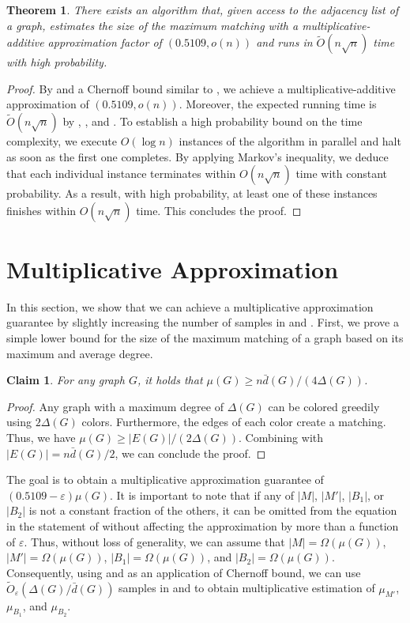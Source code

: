 \documentclass[letterpaper,11pt]{article}
\renewcommand{\epsilon}{\varepsilon}
\newcommand{\wt}[1]{\ensuremath{\widetilde{#1}}}
\newtheorem{theorem}[lemma]{Theorem}
\newtheorem{claim}[lemma]{Claim}
\begin{document}
\begin{theorem}
    There exists an algorithm that, given access to the adjacency list of a graph, estimates the size of the maximum matching with a multiplicative-additive approximation factor of $(0.5109, o(n))$ and runs in $\widetilde{O}(n\sqrt{n})$ time with high probability.
\end{theorem}
\begin{proof}
    By  and a Chernoff bound similar to , we achieve a multiplicative-additive approximation of $(0.5109, o(n))$. Moreover, the expected running time is $\wt{O}(n\sqrt{n})$ by , , and . To establish a high probability bound on the time complexity, we execute $O(\log n)$ instances of the algorithm in parallel and halt as soon as the first one completes. By applying Markov’s inequality, we deduce that each individual instance terminates within $O(n\sqrt{n})$ time with constant probability. As a result, with high probability, at least one of these instances finishes within $O(n\sqrt{n})$ time. This concludes the proof.
\end{proof}



\section{Multiplicative Approximation}\label{sec:multiplicative}
In this section, we show that we can achieve a multiplicative approximation guarantee by slightly increasing the number of samples in  and . First, we prove a simple lower bound for the size of the maximum matching of a graph based on its maximum and average degree.

\begin{claim}\label{clm:mu-delta-d}
    For any graph $G$, it holds that $\mu(G) \geq n\bar{d}(G) / (4\Delta(G))$.
\end{claim}
\begin{proof}
    Any graph with a maximum degree of $\Delta(G)$ can be colored greedily using $2\Delta(G)$ colors. Furthermore, the edges of each color create a matching. Thus, we have $\mu(G) \geq |E(G)| / (2\Delta(G))$. Combining with $|E(G)| = n\bar{d}(G)/2$, we can conclude the proof.
\end{proof}

The goal is to obtain a multiplicative approximation guarantee of $(0.5109 - \epsilon) \mu(G)$. It is important to note that if any of \( |M| \), \( |M'| \), \( |B_1| \), or \( |B_2| \) is not a constant fraction of the others, it can be omitted from the equation in the statement of  without affecting the approximation by more than a function of \( \epsilon \). Thus, without loss of generality, we can assume that $|M| = \Omega(\mu(G))$, $|M'| = \Omega(\mu(G))$, $|B_1| = \Omega(\mu(G))$, and $|B_2| = \Omega(\mu(G))$. Consequently, using  and as an application of Chernoff bound, we can use $\wt{O}_\epsilon(\Delta(G)/\bar{d}(G))$ samples in  and  to obtain multiplicative estimation of $\mu_{M'}$, $\mu_{B_1}$, and $\mu_{B_2}$.
\end{document}
